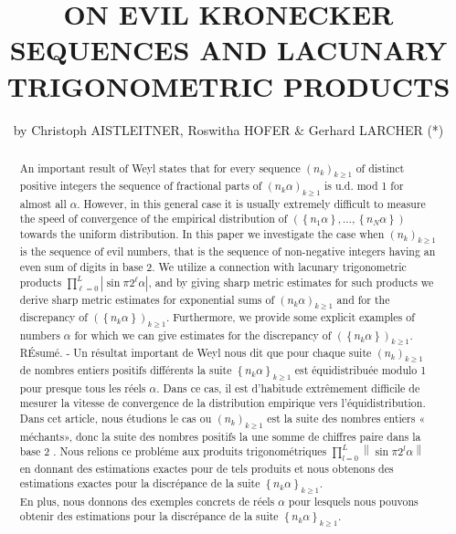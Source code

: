 \documentclass[10pt]{article}
\title{ON EVIL KRONECKER SEQUENCES AND LACUNARY TRIGONOMETRIC PRODUCTS }
\author{by Christoph AISTLEITNER, Roswitha HOFER \& Gerhard LARCHER (*)}
\date{}
\begin{document}
\maketitle
\captionsetup{singlelinecheck=false}


\begin{abstract}
An important result of Weyl states that for every sequence $\left(n_{k}\right)_{k \geqslant 1}$ of distinct positive integers the sequence of fractional parts of $\left(n_{k} \alpha\right)_{k \geqslant 1}$ is u.d. mod 1 for almost all $\alpha$. However, in this general case it is usually extremely difficult to measure the speed of convergence of the empirical distribution of $\left(\left\{n_{1} \alpha\right\}, \ldots,\left\{n_{N} \alpha\right\}\right)$ towards the uniform distribution. In this paper we investigate the case when $\left(n_{k}\right)_{k \geqslant 1}$ is the sequence of evil numbers, that is the sequence of non-negative integers having an even sum of digits in base 2. We utilize a connection with lacunary trigonometric products $\prod_{\ell=0}^{L}\left|\sin \pi 2^{\ell} \alpha\right|$, and by giving sharp metric estimates for such products we derive sharp metric estimates for exponential sums of $\left(n_{k} \alpha\right)_{k \geqslant 1}$ and for the discrepancy of $\left(\left\{n_{k} \alpha\right\}\right)_{k \geqslant 1}$. Furthermore, we provide some explicit examples of numbers $\alpha$ for which we can give estimates for the discrepancy of $\left(\left\{n_{k} \alpha\right\}\right)_{k \geqslant 1}$.\\
RÉsumé. - Un résultat important de Weyl nous dit que pour chaque suite $\left(n_{k}\right)_{k \geqslant 1}$ de nombres entiers positifs différents la suite $\left\{n_{k} \alpha\right\}_{k \geqslant 1}$ est équidistribuée modulo 1 pour presque tous les réels $\alpha$. Dans ce cas, il est d'habitude extrêmement difficile de mesurer la vitesse de convergence de la distribution empirique vers l'équidistribution.\\
Dans cet article, nous étudions le cas ou $\left(n_{k}\right)_{k \geqslant 1}$ est la suite des nombres entiers « méchants», donc la suite des nombres positifs la une somme de chiffres paire dans la base 2 . Nous relions ce probléme aux produits trigonométriques $\prod_{l=0}^{L}\left\|\sin \pi 2^{l} \alpha\right\|$ en donnant des estimations exactes pour de tels produits et nous obtenons des estimations exactes pour la discrépance de la suite $\left\{n_{k} \alpha\right\}_{k \geqslant 1}$.\\
En plus, nous donnons des exemples concrets de réels $\alpha$ pour lesquels nous pouvons obtenir des estimations pour la discrépance de la suite $\left\{n_{k} \alpha\right\}_{k \geqslant 1}$.
\end{abstract}
\end{document}
